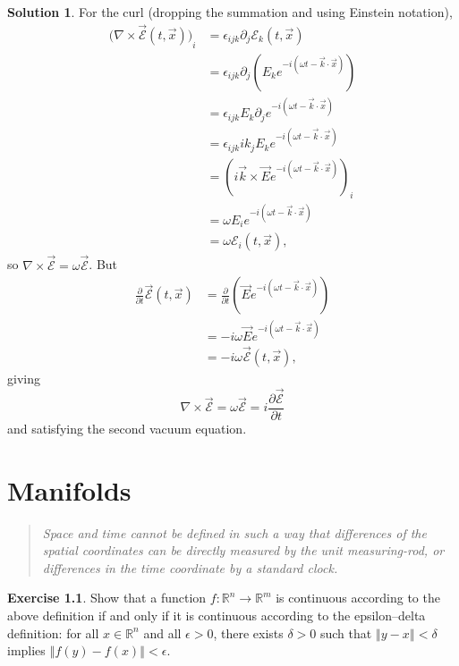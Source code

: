 \documentclass[11pt, a4paper]{report}
\theoremstyle{definition}
\newtheorem{ex}{Exercise}[part]
\newtheorem{sol}{Solution}[part]
\newenvironment{epigraph}
    {\begin{quote}\small\itshape} %
    {\end{quote}\ignorespacesafterend\vspace{\parskip}}
\newcommand*{\norm}[1]{\ensuremath{\left\Vert#1\right\Vert}}
\begin{document}
\begin{sol}
For the curl (dropping the summation and using Einstein notation),
\begin{align*}
    {\bigl( \nabla \times \vec{\mathcal{E}}(t, \vec{x}) \bigr)}_i &= \epsilon_{ijk} \partial_j \mathcal{E}_k(t, \vec{x}) \\
        &= \epsilon_{ijk} \partial_j \left(E_k e^{-i(\omega t - \vec{k} \cdot \vec{x})} \right) \\
        &= \epsilon_{ijk} E_k \partial_j e^{-i(\omega t - \vec{k} \cdot \vec{x})} \\
        &= \epsilon_{ijk}i k_j E_k e^{-i(\omega t - \vec{k} \cdot \vec{x})} \\
        &= {\left(i \vec{k} \times \vec{E} e^{-i(\omega t - \vec{k} \cdot \vec{x})} \right)}_i \\
        &= \omega E_i e^{-i(\omega t - \vec{k} \cdot \vec{x})} \\
        &= \omega \mathcal{E}_i(t, \vec{x}),
\end{align*}
so $\nabla \times \vec{\mathcal{E}} = \omega \vec{\mathcal{E}}$.
But
\begin{align*}
    \frac{\partial}{\partial t} \vec{\mathcal{E}}(t, \vec{x}) &= \frac{\partial}{\partial t} \left(\vec{E} e^{-i(\omega t - \vec{k} \cdot \vec{x})} \right) \\
        &= -i \omega \vec{E} e^{-i(\omega t - \vec{k} \cdot \vec{x})} \\
        &= -i \omega \vec{\mathcal{E}}(t, \vec{x}),
\end{align*}
giving
\[
    \nabla \times \vec{\mathcal{E}} = \omega \vec{\mathcal{E}} = i \frac{\partial \vec{\mathcal{E}}}{\partial t}
\]
and satisfying the second vacuum equation.

\end{sol}

\chapter{Manifolds}

\begin{epigraph}
    Space and time cannot be defined in such a way that differences of the spatial coordinates can be directly measured by the unit measuring-rod, or differences in the time coordinate by a standard clock.
\end{epigraph}

\begin{ex}

Show that a function $f: \mathbb{R}^n \to \mathbb{R}^m$ is continuous according to the above definition if and only if it is continuous according to the epsilon--delta definition: for all $x \in \mathbb{R}^n$ and all $\epsilon > 0$, there exists $\delta > 0$ such that $\norm{y - x} < \delta$ implies $\norm{f(y) - f(x)} < \epsilon$.

\end{ex}
\end{document}
